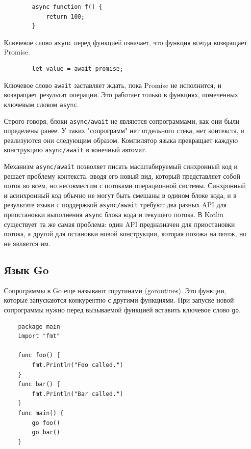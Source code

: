 	\begin{lstlisting}
		async function f() {
			return 100;
		}
	\end{lstlisting}

	Ключевое слово \texttt{async} перед функцией означает, что функция всегда возвращает Promise.
	
	\begin{lstlisting}
		let value = await promise;
	\end{lstlisting}
	Ключевое слово \texttt{await} заставляет ждать, пока Promise не исполнится, и 
	возвращает результат операции. Это работает только в функциях, помеченных ключевым словом \texttt{async}. 
	\par
	Строго говоря, блоки \texttt{async/await} не являются сопрограммами, как они были определены ранее. 
	У таких "сопрограмм" нет отдельного стека, нет контекста, и реализуются они следующим образом. 
	Компилятор языка превращает каждую конструкцию \texttt{async/await} в конечный автомат.

	Механизм \texttt{async/await} позволяет писать масштабируемый синхронный код и решает проблему контекста, вводя
	его	новый вид, который представляет собой поток во всем, но несовместим с потоками операционной
	системы. Синхронный и асинхронный код обычно не могут быть смешаны в одином блоке кода, и в
	результате языки с поддержкой \texttt{async/await} требуют два разных API для приостановки выполнения \texttt{async}
	блока кода и текущего потока. В Kotlin существует та же самая проблема: один API предназначен для
	приостановки потока, а другой для остановки новой конструкции, которая похожа на поток, но не является им.
	\clearpage
	
	\subsection{Язык Go}
	Сопрограммы в Go еще называют горутинами (goroutines). Это функции, которые запускаются конкурентно с другими функциями. 
	При запуске новой сопрограммы нужно перед вызываемой функцией вставить ключевое слово \texttt{go}.
	
	\begin{lstlisting}
	package main
	import "fmt"
	
	func foo() {
		fmt.Println("Foo called.")
	}
	func bar() {
		fmt.Println("Bar called.")
	}
	func main() {
		go foo()
		go bar()
	}

	\end{lstlisting}
		
